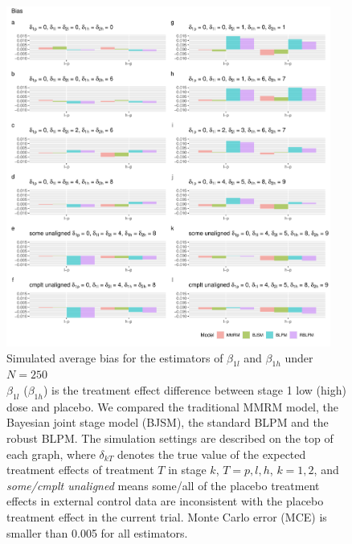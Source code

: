 \begin{figure}
\includegraphics[width=0.95\textwidth]{chapters/figures/Bias_250.pdf}
\caption{Simulated average bias for the estimators of $\beta_{1l}$ and $\beta_{1h}$ under $N = 250$ \\$\beta_{1l}$ ($\beta_{1h}$) is the treatment effect difference between stage 1 low (high) dose and placebo. We compared the traditional MMRM model, the Bayesian joint stage model (BJSM), the standard BLPM and the robust BLPM. The simulation settings are described on the top of each graph, where $\delta_{kT}$ denotes the true value of the expected treatment effects of treatment $T$ in stage $k$, $T = p, l, h$, $k = 1, 2$, and \emph{some/cmplt unaligned} means some/all of the placebo treatment effects in external control data are inconsistent with the placebo treatment effect in the current trial. Monte Carlo error (MCE) is smaller than 0.005 for all estimators.}
\label{fig:Bias_250}
\end{figure}


